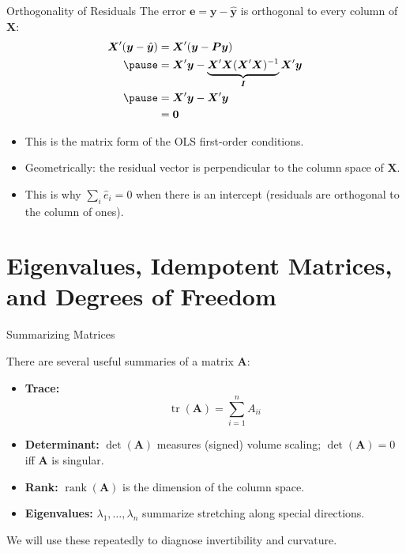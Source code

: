 \documentclass[aspectratio=169, handout, t]{beamer}
\DeclareMathOperator{\tr}{tr}
\DeclareMathOperator{\rank}{rank}
\numberwithin{equation}{section}
\begin{document}
\begin{frame}{Orthogonality of Residuals}
The error $\bm{e}=\bm{y}-\hat{\bm{y}}$ is orthogonal to every column of $\bm{X}$:
    \begin{align*}
      \bm{X}'(\bm{y}-\hat{\bm{y}}) &= \bm{X}'(\bm{y}-\bm{P}\bm{y})\\\pause
      &= \bm{X}'\bm{y} - \underbrace{\bm{X}'\bm{X}(\bm{X}'\bm{X})^{-1}}_{\bm{I}}\bm{X}'\bm{y} \\\pause
      &= \bm{X}'\bm{y} - \bm{X}'\bm{y} \\
      &= \bm{0}
    \end{align*}\pause
\begin{itemize}
\item This is the matrix form of the OLS first-order conditions.
\item Geometrically: the residual vector is perpendicular to the column space of $\bm{X}$.\pause
\item This is why $\sum_i \hat{e}_i = 0$ when there is an intercept (residuals are orthogonal to the column of ones).
\end{itemize}
\end{frame}




\section[Eigen/DoF]{Eigenvalues, Idempotent Matrices, and Degrees of Freedom}

\begin{frame}{Summarizing Matrices}

There are several useful summaries of a matrix $\bm{A}$:

\begin{itemize}
    \item \textbf{Trace:}
    \[
    \tr(\bm{A})=\sum_{i=1}^n A_{ii}
    \]\pause
    \item \textbf{Determinant:} $\det(\bm{A})$ measures (signed) volume scaling; $\det(\bm{A})=0$ iff $\bm{A}$ is singular.\pause
    \item \textbf{Rank:} $\rank(\bm{A})$ is the dimension of the column space.
    \item \textbf{Eigenvalues:} $\lambda_1,\ldots,\lambda_n$ summarize stretching along special directions.
\end{itemize}

\vspace{0.2cm}
We will use these repeatedly to diagnose invertibility and curvature.

\end{frame}
\end{document}
